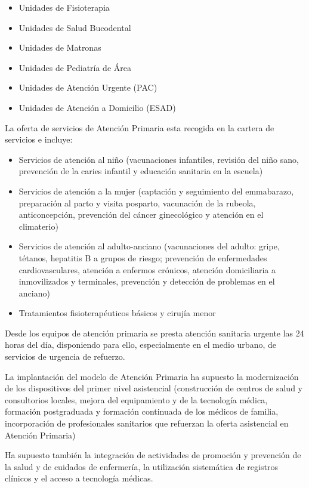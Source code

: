 \begin{itemize}
    \item Unidades de Fisioterapia
    \item Unidades de Salud Bucodental
    \item Unidades de Matronas
    \item Unidades de Pediatría de Área
    \item Unidades de Atención Urgente (PAC)
    \item Unidades de Atención a Domicilio (ESAD)
\end{itemize}

La oferta de servicios de Atención Primaria esta recogida en la cartera de servicios e incluye:

\begin{itemize}
    \item Servicios de atención al niño (vacunaciones infantiles, revisión del niño sano, prevención de la caries infantil y educación sanitaria en la escuela)
    \item Servicios de atención a la mujer (captación y seguimiento del emmabarazo, preparación al parto y visita posparto, vacunación de la rubeola, anticoncepción, prevención del cáncer ginecológico y atención en el climaterio)
    \item Servicios de atención al adulto-anciano (vacunaciones del adulto: gripe, tétanos, hepatitis B a grupos de riesgo; prevención de enfermedades cardiovasculares, atención a enfermos crónicos, atención domiciliaria a inmovilizados y terminales, prevención y detección de problemas en el anciano)
    \item Tratamientos fisioterapéuticos básicos y cirujía menor
\end{itemize}

Desde los equipos de atención primaria se presta atención sanitaria urgente las 24 horas del día, disponiendo para ello, especialmente en el medio urbano, de servicios de urgencia de refuerzo.

La implantación del modelo de Atención Primaria ha supuesto la modernización de los dispositivos del primer nivel asistencial (construcción de centros de salud y consultorios locales, mejora del equipamiento y de la tecnología médica, formación postgraduada y formación continuada de los médicos de familia, incorporación de profesionales sanitarios que refuerzan la oferta asistencial en Atención Primaria)

Ha supuesto también la integración de actividades de promoción y prevención de la salud y de cuidados de enfermería, la utilización sistemática de registros clínicos y el acceso a tecnología médicas.

